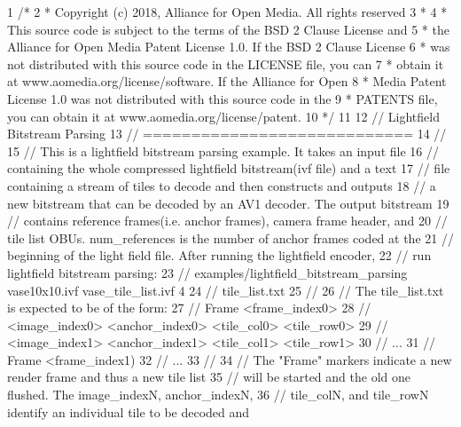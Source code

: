 \begin{DoxyCodeInclude}
1 \textcolor{comment}{/*}
2 \textcolor{comment}{ * Copyright (c) 2018, Alliance for Open Media. All rights reserved}
3 \textcolor{comment}{ *}
4 \textcolor{comment}{ * This source code is subject to the terms of the BSD 2 Clause License and}
5 \textcolor{comment}{ * the Alliance for Open Media Patent License 1.0. If the BSD 2 Clause License}
6 \textcolor{comment}{ * was not distributed with this source code in the LICENSE file, you can}
7 \textcolor{comment}{ * obtain it at www.aomedia.org/license/software. If the Alliance for Open}
8 \textcolor{comment}{ * Media Patent License 1.0 was not distributed with this source code in the}
9 \textcolor{comment}{ * PATENTS file, you can obtain it at www.aomedia.org/license/patent.}
10 \textcolor{comment}{ */}
11 
12 \textcolor{comment}{// Lightfield Bitstream Parsing}
13 \textcolor{comment}{// ============================}
14 \textcolor{comment}{//}
15 \textcolor{comment}{// This is a lightfield bitstream parsing example. It takes an input file}
16 \textcolor{comment}{// containing the whole compressed lightfield bitstream(ivf file) and a text}
17 \textcolor{comment}{// file containing a stream of tiles to decode and then constructs and outputs}
18 \textcolor{comment}{// a new bitstream that can be decoded by an AV1 decoder. The output bitstream}
19 \textcolor{comment}{// contains reference frames(i.e. anchor frames), camera frame header, and}
20 \textcolor{comment}{// tile list OBUs. num\_references is the number of anchor frames coded at the}
21 \textcolor{comment}{// beginning of the light field file.  After running the lightfield encoder,}
22 \textcolor{comment}{// run lightfield bitstream parsing:}
23 \textcolor{comment}{// examples/lightfield\_bitstream\_parsing vase10x10.ivf vase\_tile\_list.ivf 4}
24 \textcolor{comment}{//   tile\_list.txt}
25 \textcolor{comment}{//}
26 \textcolor{comment}{// The tile\_list.txt is expected to be of the form:}
27 \textcolor{comment}{// Frame <frame\_index0>}
28 \textcolor{comment}{// <image\_index0> <anchor\_index0> <tile\_col0> <tile\_row0>}
29 \textcolor{comment}{// <image\_index1> <anchor\_index1> <tile\_col1> <tile\_row1>}
30 \textcolor{comment}{// ...}
31 \textcolor{comment}{// Frame <frame\_index1)}
32 \textcolor{comment}{// ...}
33 \textcolor{comment}{//}
34 \textcolor{comment}{// The "Frame" markers indicate a new render frame and thus a new tile list}
35 \textcolor{comment}{// will be started and the old one flushed.  The image\_indexN, anchor\_indexN,}
36 \textcolor{comment}{// tile\_colN, and tile\_rowN identify an individual tile to be decoded and}

\end{DoxyCodeInclude}
